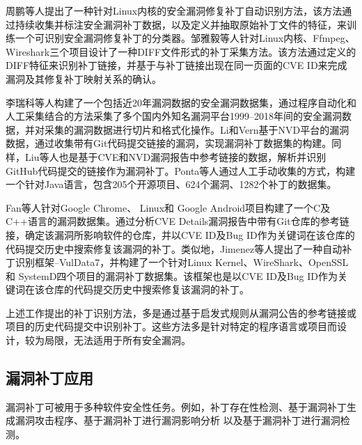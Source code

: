 周鹏等人\cite{9周鹏2022一种}提出了一种针对Linux内核的安全漏洞修复补丁自动识别方法，该方法通过持续收集并标注安全漏洞补丁数据，以及定义并抽取原始补丁文件的特征，来训练一个可识别安全漏洞修复补丁的分类器。邹雅毅等人\cite{7邹雅毅2016开源软件漏洞补丁的采集与整理}针对Linux内核、Ffmpeg、Wireshark三个项目设计了一种DIFF文件形式的补丁采集方法。该方法通过定义的DIFF特征来识别补丁链接，并基于与补丁链接出现在同一页面的CVE ID来完成漏洞及其修复补丁映射关系的确认。

李瑞科等人\cite{10李瑞科20191999}构建了一个包括近20年漏洞数据的安全漏洞数据集，通过程序自动化和人工采集结合的方法采集了多个国内外知名漏洞平台1999–2018年间的安全漏洞数据，并对采集的漏洞数据进行切片和格式化操作。Li和Vern\cite{li2017large}基于NVD平台的漏洞数据，通过收集带有Git代码提交链接的漏洞，实现漏洞补丁数据集的构建。同样，Liu等人\cite{liu2020large}也是基于CVE和NVD漏洞报告中参考链接的数据，解析并识别GitHub代码提交的链接作为漏洞补丁。Ponta等人\cite{ponta2019manually}通过人工手动收集的方式，构建一个针对Java语言，包含205个开源项目、624个漏洞、1282个补丁的数据集。

Fan等人\cite{fan2020ac}针对Google Chrome、 Linux和 Google Android项目构建了一个C及C++语言的漏洞数据集。通过分析CVE Details漏洞报告中带有Git仓库的参考链接，确定该漏洞所影响软件的仓库，并以CVE ID及Bug ID作为关键词在该仓库的代码提交历史中搜索修复该漏洞的补丁。类似地，Jimenez等人\cite{jimenez2018enabling}提出了一种自动补丁识别框架--VulData7，并构建了一个针对Linux Kernel、WireShark、OpenSSL和 SystemD四个项目的漏洞补丁数据集。该框架也是以CVE ID及Bug ID作为关键词在该仓库的代码提交历史中搜索修复该漏洞的补丁。

上述工作提出的补丁识别方法，多是通过基于启发式规则从漏洞公告的参考链接或项目的历史代码提交中识别补丁。这些方法多是针对特定的程序语言或项目而设计，较为局限，无法适用于所有安全漏洞。


\subsection{漏洞补丁应用}
漏洞补丁可被用于多种软件安全性任务。例如，补丁存在性检测\cite{8文琪2020}、基于漏洞补丁生成漏洞攻击程序\cite{brumley2008automatic,you2017semfuzz}、基于漏洞补丁进行漏洞影响分析\cite{4李舟军2015软件安全漏洞检测技术,5李韵2020基于机器学习的软件漏洞挖掘方法综述,pashchenko2018vulnerable,ponta2020detection,pashchenko2020vuln4real,Wang2020empirical} 以及基于漏洞补丁进行漏洞检测\cite{li2016vulpecker,li2018vuldeepecker,zhou2019devign,jimenez2019importance}。%

